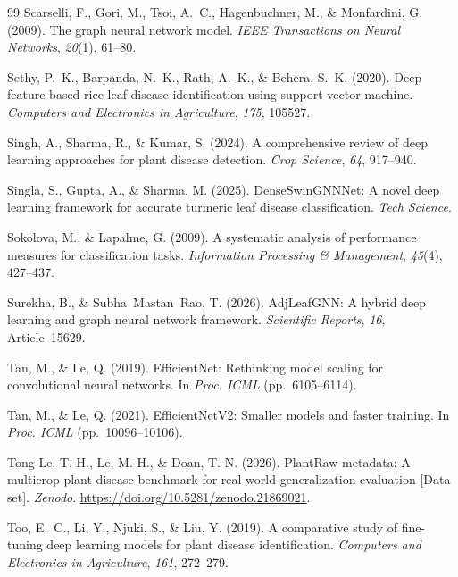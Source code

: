 \documentclass[]{interact}
\theoremstyle{plain}
\theoremstyle{definition}
\theoremstyle{remark}
\begin{document}
\begin{thebibliography}{99}
Scarselli, F., Gori, M., Tsoi, A.~C., Hagenbuchner, M., \& Monfardini, G. (2009). The graph neural network model. \emph{IEEE Transactions on Neural Networks}, \emph{20}(1), 61--80.

Sethy, P.~K., Barpanda, N.~K., Rath, A.~K., \& Behera, S.~K. (2020). Deep feature based rice leaf disease identification using support vector machine. \emph{Computers and Electronics in Agriculture}, \emph{175}, 105527.

Singh, A., Sharma, R., \& Kumar, S. (2024). A comprehensive review of deep learning approaches for plant disease detection. \emph{Crop Science}, \emph{64}, 917--940.

Singla, S., Gupta, A., \& Sharma, M. (2025). DenseSwinGNNNet: A novel deep learning framework for accurate turmeric leaf disease classification. \emph{Tech Science}.

Sokolova, M., \& Lapalme, G. (2009). A systematic analysis of performance measures for classification tasks. \emph{Information Processing \& Management}, \emph{45}(4), 427--437.

Surekha, B., \& Subha~Mastan~Rao, T. (2026). AdjLeafGNN: A hybrid deep learning and graph neural network framework. \emph{Scientific Reports}, \emph{16}, Article~15629.

Tan, M., \& Le, Q. (2019). EfficientNet: Rethinking model scaling for convolutional neural networks. In \emph{Proc. ICML} (pp.~6105--6114).

Tan, M., \& Le, Q. (2021). EfficientNetV2: Smaller models and faster training. In \emph{Proc. ICML} (pp.~10096--10106).

Tong-Le, T.-H., Le, M.-H., \& Doan, T.-N. (2026). PlantRaw metadata: A multicrop plant disease benchmark for real-world generalization evaluation [Data set]. \emph{Zenodo}. \url{https://doi.org/10.5281/zenodo.21869021}.

Too, E.~C., Li, Y., Njuki, S., \& Liu, Y. (2019). A comparative study of fine-tuning deep learning models for plant disease identification. \emph{Computers and Electronics in Agriculture}, \emph{161}, 272--279.


\end{thebibliography}
\end{document}
